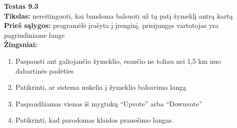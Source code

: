 \documentclass{VUMIFPSkursinis}
\begin{document}
		\textbf{Testas 9.3}\\
		\textbf{Tikslas:} nereitinguoti, kai bandoma balsuoti už tą patį žymeklį antrą kartą\\
		\textbf{Prieš sąlygos:} programėlė įrašyta į įrenginį, prisijungęs vartotojas yra pagrindiniame lange\\
		\textbf{Žingsniai:}
		\begin{enumerate}[noitemsep,topsep=0pt]
			\item Paspausti ant galiojančio žymeklio, esančio ne toliau nei 1,5 km nuo dabartinės padėties
			\item Patikrinti, ar sistema nukelia į žymeklio balsavimo langą
			\item Paspaudžiamas vienas iš mygtukų “Upvote” arba “Downvote”
			\item Patikrinti, kad parodomas klaidos pranešimo langas.
		\end{enumerate}
\end{document}
